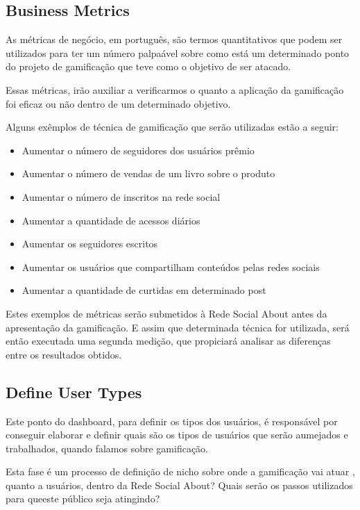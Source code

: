 \subsection{Business Metrics}
\label{sub:business_metrics}
As métricas de negócio, em português, são termos quantitativos que podem ser utilizados
para ter um número palpaável sobre como está um determinado ponto do projeto de gamificação
que teve como o objetivo de ser atacado.

Essas métricas, irão auxiliar a verificarmos o quanto a aplicação da gamificação
 foi eficaz ou
não dentro de um determinado objetivo.

Alguns exêmplos de técnica de gamificação que serão utilizadas estão a seguir:

\begin{itemize}
    \item Aumentar o número de seguidores dos usuários prêmio
    \item Aumentar o número de vendas de um livro sobre o produto
    \item Aumentar o número de inscritos na rede social
    \item Aumentar a quantidade de acessos diários
    \item Aumentar os seguidores escritos
    \item Aumentar os usuários que compartilham conteúdos pelas redes sociais
    \item Aumentar a quantidade de curtidas em determinado post
\end{itemize}

Estes exemplos de métricas serão submetidos à Rede Social About antes da apresentação da
gamificação. E assim que determinada técnica for utilizada, será então executada
 uma
segunda medição, que propiciará analisar as diferenças entre os resultados obtidos.

\subsection{Define User Types}
\label{sub:define_user_types}
Este ponto do dashboard, para definir os tipos dos usuários, é responsável por conseguir
elaborar e definir quais são os tipos de usuários que serão aumejados e trabalhados, quando
falamos sobre gamificação.

Esta fase é um processo de definição de nicho sobre onde a gamificação vai atuar
, quanto a
usuários, dentro da Rede Social About? Quais serão os passos utilizados para queeste público
seja atingindo?

